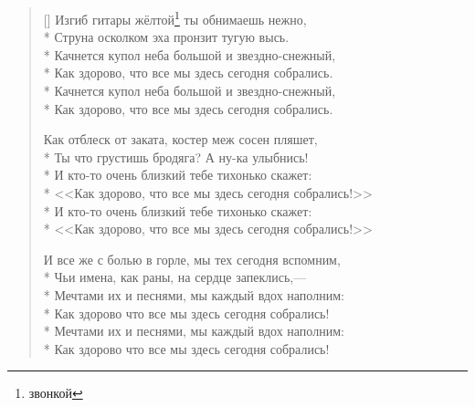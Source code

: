\documentclass[a4paper,oneside,14pt]{scrbook}
\begin{document}
    \settowidth{\versewidth}{Как здорово, что все мы здесь сегодня собрались}
    \begin{verse}[\versewidth]
        Изгиб гитары жёлтой\footnote{звонкой} ты обнимаешь нежно,\\*
        Струна осколком эха пронзит тугую высь.\\*
        Качнется купол неба большой и звездно-снежный,\\*
        Как здорово, что все мы здесь сегодня собрались.\\*
        \vin Качнется купол неба большой и звездно-снежный,\\*
        \vin Как здорово, что все мы здесь сегодня собрались.

        Как отблеск от заката, костер меж сосен пляшет,\\*
        Ты что грустишь бродяга? А ну-ка улыбнись!\\*
        И кто-то очень близкий тебе тихонько скажет:\\*
        <<Как здорово, что все мы здесь сегодня собрались!>>\\*
        \vin И кто-то очень близкий тебе тихонько скажет:\\*
        \vin <<Как здорово, что все мы здесь сегодня собрались!>>

        И все же с болью в горле, мы тех сегодня вспомним,\\*
        Чьи имена, как раны, на сердце запеклись,---\\*
        Мечтами их и песнями, мы каждый вдох наполним:\\*
        Как здорово что все мы здесь сегодня собрались!\\*
        \vin Мечтами их и песнями, мы каждый вдох наполним:\\*
        \vin Как здорово что все мы здесь сегодня собрались!
    \end{verse}
\end{document}

